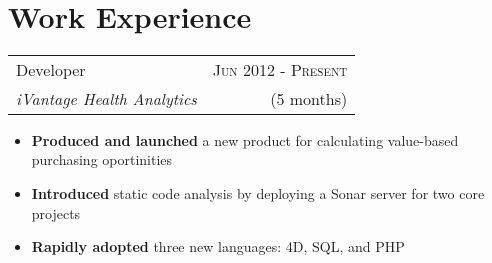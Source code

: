 \documentclass[10pt]{article} %
\begin{document}
\color{text1} %


\par{\\ %


\begin{minipage}[t]{0.5\textwidth}
\vspace{0pt} %


\section{Work Experience}


\begin{tabularx}{\linewidth}{ X r }
  {\large Developer } & {\textsc{Jun 2012 - Present}} \\
  {\small\textit{iVantage Health Analytics}} & {\small{(5 months)}}
\end{tabularx}

\begin{itemize}
  \item \textbf{Produced and launched} a new product for calculating value-based purchasing oportinities
  \item \textbf{Introduced} static code analysis by deploying a Sonar server for two core projects
  \item \textbf{Rapidly adopted} three new languages: 4D, SQL, and PHP
\end{itemize}



\end{minipage}}
\end{document}
